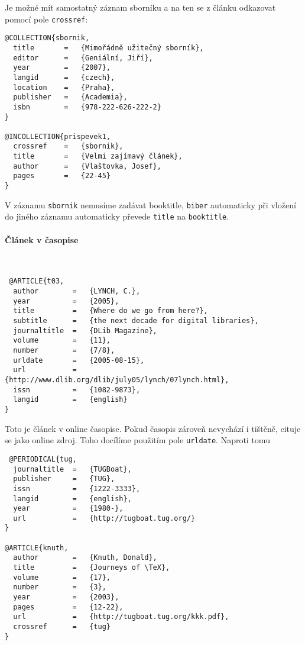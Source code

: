 \documentclass[a4paper,10pt]{ltxdockit}
\def\t|#1|{\texttt{#1}}
\def\c#1{%
\hangpara{3em}{1}%
\fullcite{#1}}
\begin{document}
 Je možné mít samostatný záznam sborníku a na ten se z článku odkazovat pomocí pole \t|crossref|:
 
\noindent\c{prispevek1}
 
 \begin{verbatim}
@COLLECTION{sbornik,
  title       =   {Mimořádně užitečný sborník},
  editor      =   {Geniální, Jiří},
  year        =   {2007},
  langid      =   {czech},
  location    =   {Praha},
  publisher   =   {Academia},
  isbn        =   {978-222-626-222-2}
}

@INCOLLECTION{prispevek1,
  crossref    =   {sbornik},
  title       =   {Velmi zajímavý článek},
  author      =   {Vlaštovka, Josef},
  pages       =   {22-45}
}
 \end{verbatim}
 
 V záznamu \t|sbornik| nemusíme zadávat booktitle, \t|biber| automaticky při vložení do jiného záznamu automaticky převede \t|title| na \t|booktitle|. 
 
 \paragraph{Článek v časopise}\hfill\\
 
 \c{t03}
 \begin{verbatim}
 @ARTICLE{t03,
  author        =   {LYNCH, C.},
  year          =   {2005},
  title         =   {Where do we go from here?},
  subtitle      =   {the next decade for digital libraries},
  journaltitle  =   {DLib Magazine},
  volume        =   {11},
  number        =   {7/8},
  urldate       =   {2005-08-15},
  url           =   {http://www.dlib.org/dlib/july05/lynch/07lynch.html}, 
  issn          =   {1082-9873},
  langid        =   {english}
}
 \end{verbatim}
 
\noindent Toto je článek v online časopise. Pokud časopis zároveň nevychází i tištěně, cituje se jako online zdroj. Toho docílíme použitím pole \t|urldate|. Naproti tomu 
 
 \c{knuth}
 \begin{verbatim}
 @PERIODICAL{tug,
  journaltitle  =   {TUGBoat},
  publisher     =   {TUG},
  issn          =   {1222-3333},
  langid        =   {english},
  year          =   {1980-},
  url           =   {http://tugboat.tug.org/}
}

@ARTICLE{knuth,
  author        =   {Knuth, Donald},
  title         =   {Journeys of \TeX},
  volume        =   {17},
  number        =   {3},
  year          =   {2003},
  pages         =   {12-22},
  url           =   {http://tugboat.tug.org/kkk.pdf},
  crossref      =   {tug}
}
 \end{verbatim}
 
\end{document}
